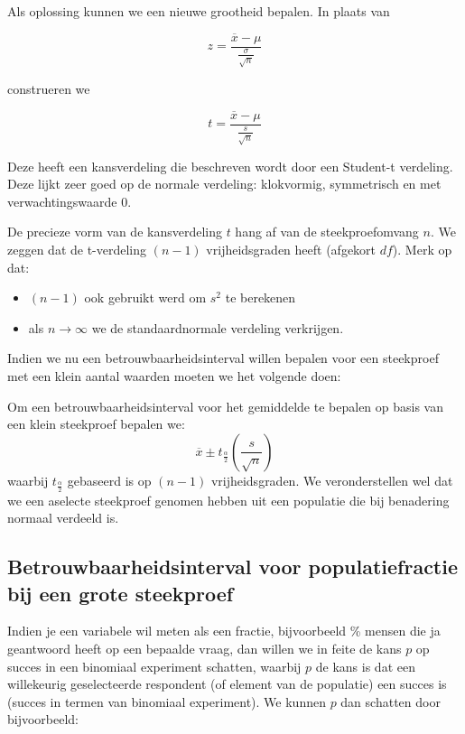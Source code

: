 {Als oplossing kunnen we een nieuwe grootheid bepalen. In plaats van

\[ z = \frac{\overline{x} - \mu}{\frac{\sigma}{\sqrt{n}}} \]

construeren we

\[ t = \frac{\overline{x} - \mu}{\frac{s}{\sqrt{n}}} \]

Deze heeft een kansverdeling die beschreven wordt door een Student-t verdeling. Deze lijkt zeer goed op de normale verdeling: klokvormig, symmetrisch en met verwachtingswaarde 0.

De precieze vorm van de kansverdeling $t$ hang af van de steekproefomvang $n$. We zeggen dat de t-verdeling $(n-1)$ vrijheidsgraden heeft (afgekort $df$).
Merk op dat:
\begin{itemize}
  \item $(n-1)$ ook gebruikt werd om $s^{2}$ te berekenen
  \item als $n \rightarrow \infty$ we de standaardnormale verdeling verkrijgen.
\end{itemize}

Indien we nu een betrouwbaarheidsinterval willen bepalen voor een steekproef met een klein aantal waarden moeten we het volgende doen:

\begin{definition}
  Om een betrouwbaarheidsinterval voor het gemiddelde te bepalen op basis van een klein steekproef bepalen we:
  \[ \overline{x} \pm t_{\frac{\alpha}{2}}(\frac{s}{\sqrt{n}}) \]
  waarbij $t_{\frac{\alpha}{2}}$ gebaseerd is op $(n-1)$ vrijheidsgraden. We veronderstellen wel dat we een aselecte steekproef genomen hebben uit
  een populatie die bij benadering normaal verdeeld is.
\end{definition}


\subsection{Betrouwbaarheidsinterval voor populatiefractie bij een grote steekproef}

Indien je een variabele wil meten als een fractie, bijvoorbeeld \% mensen die ja geantwoord heeft op een bepaalde vraag, dan willen we in feite de kans $p$ op succes in een binomiaal experiment schatten, waarbij $p$ de kans is dat een willekeurig geselecteerde respondent (of element van de populatie) een succes is (succes in termen van binomiaal experiment). We kunnen $p$ dan schatten door bijvoorbeeld:

}
